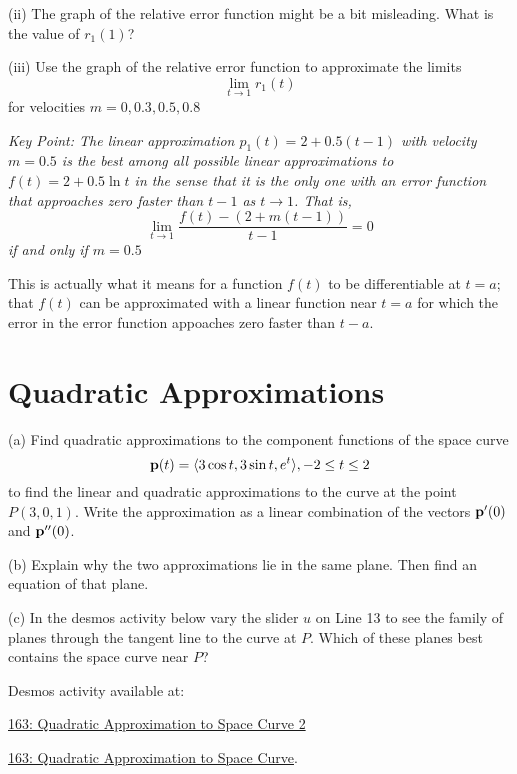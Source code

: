 \documentclass{ximera}
\begin{document}
\begin{exploration}
\begin{question}
(ii) The graph of the relative error function might be a bit misleading. What is the value of $r_1(1)$?

(iii) Use the graph of the relative error function to approximate the limits
\[
    \lim_{t\to 1}r_1(t) 
\]
for velocities $m=0, 0.3, 0.5, 0.8$
\end{question}


\it{Key Point:} The linear approximation $p_1(t)=2+0.5(t-1)$ with velocity $m=0.5$ is the best among all possible linear approximations to $f(t)=2+0.5\ln t$ in the sense that it is the \emph{only} one with an error function that approaches zero faster than $t-1$ as $t\to 1$. That is,
\[
          \lim_{t\to 1} \frac{f(t) - (2 + m(t-1))}{t-1} = 0
\]
if and only if $m=0.5$

This is actually what it means for a function $f(t)$ to be differentiable at $t=a$; that $f(t)$ can be approximated with a linear function near $t=a$ for which the error in the error function appoaches zero faster than $t-a$. 




\end{exploration}







\section{Quadratic Approximations}


\begin{question}  \label{Qgtyhtsry}
(a) Find quadratic approximations to the component functions of the space curve
\[
   {\bf p}(t) = \langle  3 \cos t, 3\sin t, e^t \rangle , -2\leq t \leq 2
\]
to find the linear and quadratic approximations to the curve at the point $P(3,0,1)$. Write the approximation as a linear combination of the vectors ${\bf p}^\prime(0)$ and ${\bf p}^{\prime\prime}(0)$.

(b) Explain why the two approximations lie in the same plane. Then find an equation of that plane.

(c) In the desmos activity below vary the slider $u$ on Line 13 to see the family of planes through the tangent line to the curve at $P$. Which of these planes best contains the space curve near $P$?

Desmos activity available at:

\href{https://www.desmos.com/3d/196e85fe1a}{163: Quadratic Approximation to Space Curve 2}


\href{https://www.desmos.com/3d/a263cd2883}{163: Quadratic Approximation to Space Curve}.

 

\end{question}
\end{document}
